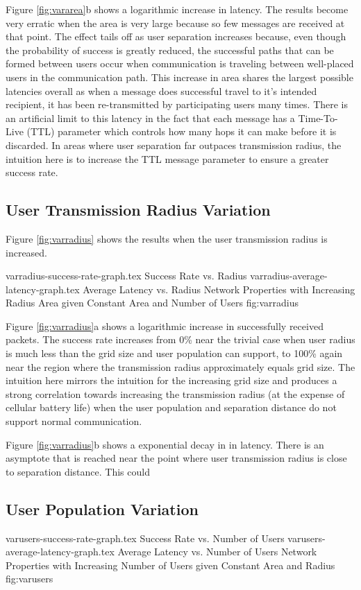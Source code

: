 Figure \ref{fig:vararea}b shows a logarithmic increase in latency.
The results become very erratic when the area is very large because so few messages
are received at that point.
The effect tails off as user separation increases because, even though the probability
of success is greatly reduced, the successful paths that can be formed between users
occur when communication is traveling between well-placed users in the communication path.
This increase in area shares the largest possible latencies overall as when a message does
successful travel to it's intended recipient, it has been re-transmitted by participating
users many times.
There is an artificial limit to this latency in the fact that each message has a Time-To-Live (TTL)
parameter which controls how many hops it can make before it is discarded.
In areas where user separation far outpaces transmission radius, the intuition here is to
increase the TTL message parameter to ensure a greater success rate.

\subsection{User Transmission Radius Variation}
Figure \ref{fig:varradius} shows the results when the user transmission radius is increased.

\sidebysidefigures
{varradius-success-rate-graph.tex}     {Success Rate vs. Radius}
{varradius-average-latency-graph.tex}  {Average Latency vs. Radius}
{Network Properties with Increasing Radius Area given Constant Area and Number of Users}
{fig:varradius}

Figure \ref{fig:varradius}a shows a logarithmic increase in successfully received packets.
The success rate increases from 0\% near the trivial case when user radius is much less
than the grid size and user population can support, to 100\% again near the region where
the transmission radius approximately equals grid size.
The intuition here mirrors the intuition for the increasing grid size and produces a strong
correlation towards increasing the transmission radius (at the expense of cellular battery life)
when the user population and separation distance do not support normal communication.

Figure \ref{fig:varradius}b shows a exponential decay in in latency.
There is an asymptote that is reached near the point where user transmission radius is
close to separation distance.
This could 

\subsection{User Population Variation}
\sidebysidefigures
{varusers-success-rate-graph.tex}      {Success Rate vs. Number of Users}
{varusers-average-latency-graph.tex}   {Average Latency vs. Number of Users}
{Network Properties with Increasing Number of Users given Constant Area and Radius}
{fig:varusers}

